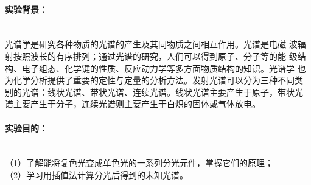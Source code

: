 \documentclass[UTF8]{ctexart}
\begin{document}
\title{}
\author{\songti{\large{}}}
\maketitle
{}
\paragraph*{实验背景：}~\\
\indent 光谱学是研究各种物质的光谱的产生及其同物质之间相互作用。光谱是电磁
波辐射按照波长的有序排列；通过光谱的研究，人们可以得到原子、分子等的能
级结构、电子组态、化学键的性质、反应动力学等多方面物质结构的知识。光谱学
也为化学分析提供了重要的定性与定量的分析方法。发射光谱可以分为三种不同类
别的光谱：线状光谱、带状光谱、连续光谱。线状光谱主要产生于原子，带状光
谱主要产生于分子，连续光谱则主要产生于白炽的固体或气体放电。~\\

\paragraph*{实验目的：}~\\
（1）了解能将复色光变成单色光的一系列分光元件，掌握它们的原理；~\\
（2）学习用插值法计算分光后得到的未知光谱。~\\
\end{document}
